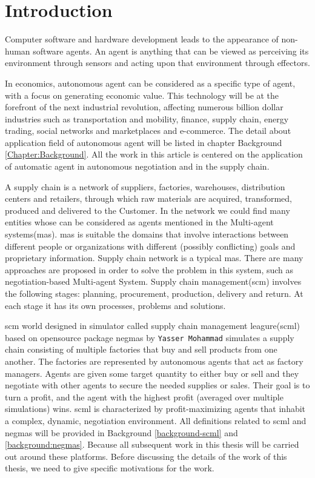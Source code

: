\chapter{Introduction}
Computer software and hardware development leads to the appearance of non-human software agents. An agent is anything that can be viewed as perceiving its environment through sensors and acting upon that environment through effectors\parencite{RePEc:aes:infoec:v:xi:y:2007:i:4:p:115-118}.

In economics, autonomous agent can be considered as a specific type of agent, with a focus on generating economic value. This technology will be at the forefront of the next industrial revolution, affecting numerous billion dollar industries such as transportation and mobility, finance, supply chain, energy trading, social networks and marketplaces and e-commerce. The detail about application field of autonomous agent will be listed in chapter Background \ref{Chapter:Background}. All the work in this article is centered on the application of automatic agent in autonomous negotiation and in the supply chain.

A supply chain is a network of suppliers, factories, warehouses, distribution centers and retailers, through which raw materials are acquired, transformed, produced and delivered to the Customer. In the network we could find many entities whose can be considered as agents mentioned in the Multi-agent systems(\gls{mas}). \gls{mas} is suitable the domains that involve interactions between different people or organizations with different (possibly conflicting) goals and proprietary information. Supply chain network is a typical \gls{mas}. There are many approaches are proposed in order to solve the problem in this system, such as negotiation-based Multi-agent System\parencite{Chen1999ANM, DBLP:journals/corr/abs-1210-3375}. Supply chain management(\gls{scm}) involves the following stages: planning, procurement, production, delivery and return. At each stage it has its own processes, problems and solutions\parencite{Darja2011}.

\gls{scm} world designed in simulator called supply chain management leagure(\gls{scml}) based on opensource package \gls{negmas} by \texttt{Yasser Mohammad} simulates a supply chain consisting of multiple factories that buy and sell products from one another. The factories are represented by autonomous agents that act as factory managers. Agents are given some target quantity to either buy or sell and they negotiate with other agents to secure the needed supplies or sales. Their goal is to turn a profit, and the agent with the highest profit (averaged over multiple simulations) wins. \gls{scml} is characterized by profit-maximizing agents that inhabit a complex, dynamic, negotiation environment\parencite{Mohammad2019}. All definitions related to \gls{scml} and \gls{negmas} will be provided in Background \ref{background-scml} and \ref{background:negmas}. Because all subsequent work in this thesis will be carried out around these platforms. Before discussing the details of the work of this thesis, we need to give specific motivations for the work. 

